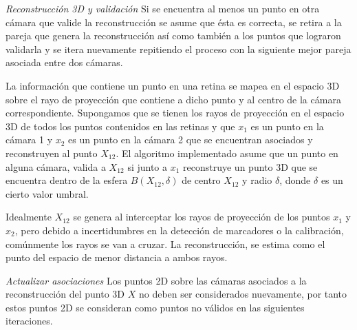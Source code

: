 \textit{Reconstrucción 3D y validación}\label{seccion_reconstruccion3D_validacion}
Si se encuentra al menos un punto en otra cámara que valide la reconstrucción se asume que ésta es correcta, se retira a la pareja que genera la reconstrucción así como también a los puntos que lograron validarla y se itera nuevamente repitiendo el proceso con la siguiente mejor pareja asociada entre dos cámaras.  



La información que contiene un punto en una retina se mapea en el espacio 3D sobre el rayo de proyección que contiene a dicho punto y al centro de la cámara correspondiente. Supongamos que se tienen los rayos de proyección en el espacio 3D de todos los puntos contenidos en las retinas y que $x_1$ es un punto en la cámara 1 y $x_2$ es un punto en la cámara 2 que se encuentran asociados y reconstruyen al punto $X_{12}$. El algoritmo implementado asume que un punto en alguna cámara, valida a $X_{12}$ si junto a $x_1$ reconstruye un punto 3D que se encuentra dentro de la esfera $B(X_{12}, \delta)$ de centro $X_{12}$ y radio $\delta$, donde $\delta$ es un cierto valor umbral. %


Idealmente $X_{12}$ se genera al interceptar los rayos de proyección de los puntos $x_1$ y $x_2$, pero debido a incertidumbres en la detección de marcadores o la calibración, comúnmente los rayos se van a cruzar. La reconstrucción, se estima como el punto del espacio de menor distancia a ambos rayos. %


\textit{Actualizar asociaciones}\label{actualizar_asociaciones}
Los puntos 2D sobre las cámaras asociados a la reconstrucción del punto 3D $X$ no deben ser considerados nuevamente, por tanto estos puntos 2D se consideran como puntos no válidos en las siguientes iteraciones.

